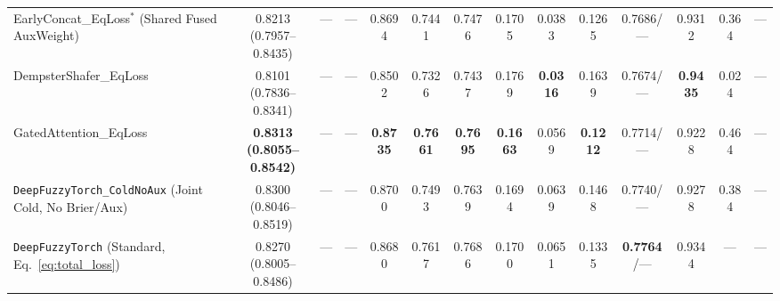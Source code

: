 \documentclass[10pt,twocolumn]{article}
\begin{document}
\begin{table}[t]
{\begin{tabular}{@{}>{\raggedright\arraybackslash}p{4.05cm}ccccccccccccc@{}}
\\
EarlyConcat\_EqLoss$^*$ (Shared Fused AuxWeight) & \shortstack{0.8213\\(0.7957--0.8435)} & ---
& --- & 0.8694 & 0.7441 & 0.7476 & 0.1705 & 0.0383 & 0.1265 & 0.7686/--- & 0.9312 & 0.364 & ---
\\
DempsterShafer\_EqLoss & \shortstack{0.8101\\(0.7836--0.8341)} & --- & --- & 0.8502 & 0.7326 &
0.7437
& 0.1769 & \textbf{0.0316} & 0.1639 & 0.7674/--- & \textbf{0.9435} & 0.024 & --- \\
GatedAttention\_EqLoss & \shortstack{\textbf{0.8313}\\\textbf{(0.8055--0.8542)}} & --- & --- &
\textbf{0.8735} & \textbf{0.7661} & \textbf{0.7695} & \textbf{0.1663} & 0.0569 &
\textbf{0.1212} & 0.7714/--- & 0.9228 & 0.464 & --- \\
\texttt{DeepFuzzyTorch\_ColdNoAux} (Joint Cold, No Brier/Aux) &
\shortstack{0.8300\\(0.8046--0.8519)} & --- & --- & 0.8700 & 0.7493 & 0.7639 & 0.1694 & 0.0639
&
0.1468 & 0.7740/--- & 0.9278 & 0.384 & --- \\
\texttt{DeepFuzzyTorch} (Standard, Eq.~\eqref{eq:total_loss}) &
\shortstack{0.8270\\(0.8005--0.8486)} & --- & --- & 0.8680 & 0.7617 & 0.7686 & 0.1700 & 0.0651
&
0.1335 & \textbf{0.7764}/--- & 0.9344 & --- & --- \\
\bottomrule
\end{tabular}%
}
\end{table}
\end{document}
